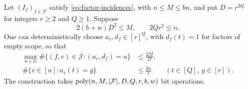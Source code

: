 \begin{lemma}\label{lem:incidence-labels}
Let $(I_f)_{f\in\mathcal F}$ satisfy \eqref{eq:factor-incidences},
with $n\le M\le bn$, and put $D=r^{2Q}$ for integers $r\ge2$ and
$Q\ge1$. Suppose
\begin{equation}\label{eq:incidence-balance-hypotheses}
 2(b+w)D^2\le M,\qquad 2Qr^2\le n.
\end{equation}
One can deterministically choose $a_v,d_f\in[r]^Q$, with $d_f(t)=1$
for factors of empty scope, so that
\[
 \begin{aligned}
 \max_{u\in\mathcal U}\#\{(f,v)\in\mathcal J:(a_v,d_f)=u\}
 &\le\frac{2M}{D},\\
 \#\{v\in[n]:a_v(t)=g\}&\le\frac{2n}{r}
 \qquad(t\in[Q],\ g\in[r]).
 \end{aligned}
\]
The construction takes
$\operatorname{poly}(n,M,|\mathcal F|,D,Q,r,b,w)$ bit operations.
\end{lemma}
